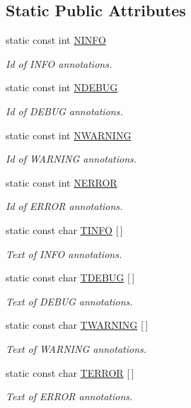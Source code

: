 \subsection*{Static Public Attributes}
\begin{DoxyCompactItemize}
\item 
static const int \hyperlink{classzbe_1_1_logger_ad30e9493ec117daa24977bfa4cc883f1}{N\+I\+N\+F\+O}
\begin{DoxyCompactList}\small\item\em Id of I\+N\+F\+O annotations. \end{DoxyCompactList}\item 
static const int \hyperlink{classzbe_1_1_logger_a33ad8282f2667bd086686ee3afa877d8}{N\+D\+E\+B\+U\+G}
\begin{DoxyCompactList}\small\item\em Id of D\+E\+B\+U\+G annotations. \end{DoxyCompactList}\item 
static const int \hyperlink{classzbe_1_1_logger_aba8b4f2b50b95b7df8475cd3cf5584b9}{N\+W\+A\+R\+N\+I\+N\+G}
\begin{DoxyCompactList}\small\item\em Id of W\+A\+R\+N\+I\+N\+G annotations. \end{DoxyCompactList}\item 
static const int \hyperlink{classzbe_1_1_logger_a78cd96d72ec926945b9a90f4d120ca28}{N\+E\+R\+R\+O\+R}
\begin{DoxyCompactList}\small\item\em Id of E\+R\+R\+O\+R annotations. \end{DoxyCompactList}\item 
static const char \hyperlink{classzbe_1_1_logger_a90a7ec362737bacdfb922582cb7e142f}{T\+I\+N\+F\+O} \mbox{[}$\,$\mbox{]}
\begin{DoxyCompactList}\small\item\em Text of I\+N\+F\+O annotations. \end{DoxyCompactList}\item 
static const char \hyperlink{classzbe_1_1_logger_a3b3e816024fb94bacee114109ce2c462}{T\+D\+E\+B\+U\+G} \mbox{[}$\,$\mbox{]}
\begin{DoxyCompactList}\small\item\em Text of D\+E\+B\+U\+G annotations. \end{DoxyCompactList}\item 
static const char \hyperlink{classzbe_1_1_logger_a9dbd65ebc9452231ee1a0adaa3c08d93}{T\+W\+A\+R\+N\+I\+N\+G} \mbox{[}$\,$\mbox{]}
\begin{DoxyCompactList}\small\item\em Text of W\+A\+R\+N\+I\+N\+G annotations. \end{DoxyCompactList}\item 
static const char \hyperlink{classzbe_1_1_logger_ac0b85a476489ca300a423ddbd1419040}{T\+E\+R\+R\+O\+R} \mbox{[}$\,$\mbox{]}
\begin{DoxyCompactList}\small\item\em Text of E\+R\+R\+O\+R annotations. \end{DoxyCompactList}\end{DoxyCompactItemize}

